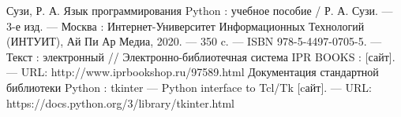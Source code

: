 \documentclass[a4paper]{article}
\begin{document}
\begin{thebibliography}{3}
  Сузи, Р. А. Язык программирования Python : учебное пособие / Р. А. Сузи. — 3-е изд. — Москва : Интернет-Университет Информационных Технологий (ИНТУИТ), Ай Пи Ар Медиа, 2020. — 350 c. — ISBN 978-5-4497-0705-5. — Текст : электронный // Электронно-библиотечная система IPR BOOKS : [сайт]. — URL: http://www.iprbookshop.ru/97589.html
   Документация стандартной библиотеки Python : tkinter — Python interface to Tcl/Tk [cайт]. --- URL: https://docs.python.org/3/library/tkinter.html
\end{thebibliography}
\end{document}
